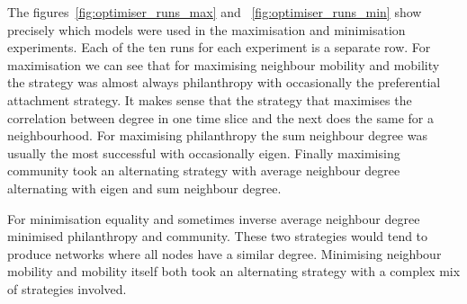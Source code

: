 \documentclass[10pt]{article}
\begin{document}
The figures~\ref{fig:optimiser_runs_max} and ~\ref{fig:optimiser_runs_min} show precisely which models were used in the maximisation and minimisation experiments. Each of the ten runs for each experiment is a separate row. For maximisation we can see that for maximising neighbour mobility and mobility the strategy was almost always philanthropy with occasionally the preferential attachment strategy. It makes sense that the strategy that maximises the correlation between degree in one time slice and the next does the same for a neighbourhood. For maximising philanthropy the sum neighbour degree was usually the most successful with occasionally eigen. Finally maximising community took an alternating strategy with average neighbour degree alternating with eigen and sum neighbour degree.

For minimisation equality and sometimes inverse average neighbour degree minimised philanthropy and community. These two strategies would tend to produce networks where all nodes have a similar degree. Minimising neighbour mobility and mobility itself both took an alternating strategy with a complex mix of strategies involved. 

\begin{figure}[!tb]
\end{figure}

\begin{figure}[!tb]
\end{figure}


\printbibliography
\end{document}
